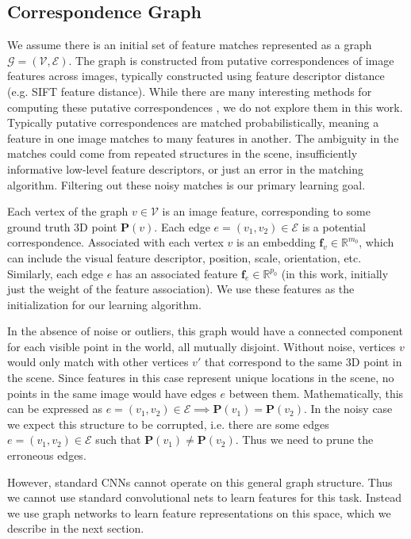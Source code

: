\documentclass[10pt,twocolumn,letterpaper]{article}
\newcommand{\bR}{\mathbb{R}}
\newcommand{\mat}[1]{\mathbf{#1}}
\begin{document}
\subsection{Correspondence Graph}
We assume there is an initial set of feature matches represented as a graph $\mathcal{G} = (\mathcal{V}, \mathcal{E})$.
The graph is constructed from putative correspondences of image features across images, typically constructed using feature descriptor distance (e.g. SIFT feature distance).
While there are many interesting methods for computing these putative correspondences \cite{suh2015subgraph, yi2018learning}, we do not explore them in this work.
Typically putative correspondences are matched probabilistically, meaning a feature in one image matches to many features in another.
The ambiguity in the matches could come from repeated structures in the scene, insufficiently informative low-level feature descriptors, or just an error in the matching algorithm.
Filtering out these noisy matches is our primary learning goal.

Each vertex of the graph $v \in \mathcal{V}$ is an image feature, corresponding to some ground truth 3D point $\mat{P}(v)$.
Each edge $e = (v_1, v_2) \in \mathcal{E}$ is a potential correspondence.
Associated with each vertex $v$ is an embedding $\mat{f}_v \in \bR^{m_0}$, which can include the visual feature descriptor, position, scale, orientation, etc.
Similarly, each edge $e$ has an associated feature $\mat{f}_e \in \bR^{p_0}$ (in this work, initially just the weight of the feature association).
We use these features as the initialization for our learning algorithm.

In the absence of noise or outliers, this graph would have a connected component for each visible point in the world, all mutually disjoint.
Without noise, vertices $v$ would only match with other vertices $v'$ that correspond to the same 3D point in the scene.
Since features in this case represent unique locations in the scene, no points in the same image would have edges $e$ between them.
Mathematically, this can be expressed as $e = (v_1, v_2) \in \mathcal{E} \implies \mat{P}(v_1) = \mat{P}(v_2)$.
In the noisy case we expect this structure to be corrupted, i.e. there are some edges $e = (v_1, v_2) \in \mathcal{E}$ such that $\mat{P}(v_1) \neq \mat{P}(v_2)$.
Thus we need to prune the erroneous edges.

However, standard CNNs cannot operate on this general graph structure.
Thus we cannot use standard convolutional nets to learn features for this task.
Instead we use graph networks to learn feature representations on this space, which we describe in the next section.
\end{document}
